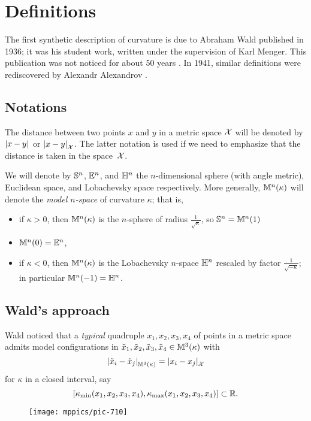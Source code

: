 \chapter{Definitions}

The first synthetic description of curvature is due to Abraham Wald \cite{wald} published in 1936;
it was his student work, written under the supervision of Karl Menger. 
This publication was not noticed for about 50 years \cite{berestovskii}.
In 1941, similar definitions were rediscovered by Alexandr Alexandrov \cite{alexandrov:def}.

\section{Notations}

The distance between two points $x$ and $y$ in a metric space $\mathcal{X}$ will be denoted by $\dist{x}{y}{}$ or $\dist{x}{y}{\spc{X}}$.
The latter notation is used if we need to emphasize 
that the distance is taken in the space~${\mathcal{X}}$.

We will denote by $\mathbb{S}^n$, $\mathbb{E}^n$, and $\mathbb{H}^n$ the $n$-dimensional sphere (with angle metric), 
Euclidean space, and Lobachevsky space respectively.
More generally, $\mathbb{M}^n(\kappa)$ will denote the \emph{model $n$-space} of curvature $\kappa$;
that is,
\begin{itemize}
\item if $\kappa>0$, then $\mathbb{M}^n(\kappa)$ is the $n$-sphere of radius $\tfrac{1}{\sqrt{\kappa}}$, so $\mathbb{S}^n=\mathbb{M}^n(1)$
\item $\mathbb{M}^n(0)=\mathbb{E}^n$,
\item if $\kappa<0$, then $\mathbb{M}^n(\kappa)$ is the Lobachevsky $n$-space $\mathbb{H}^n$ rescaled by factor $\tfrac{1}{\sqrt{-\kappa}}$;
in particular $\mathbb{M}^n(-1)=\mathbb{H}^n$.
\end{itemize}

\section{Wald's approach}

Wald noticed that a \textit{typical} quadruple $x_1,x_2,x_3,x_4$ of points in a metric space
admits model configurations in $\tilde x_1,\tilde x_2,\tilde x_3,\tilde x_4\in\mathbb{M}^3(\kappa)$ with
\[\dist{\tilde x_i}{\tilde x_j}{\MM^3(\kappa)}=\dist{x_i}{x_j}{\spc{X}}\]
for $\kappa$ in a closed interval,
say 
\[[\kappa_{\min}(x_1,x_2,x_3,x_4),\kappa_{\max}(x_1,x_2,x_3,x_4)]\subset \mathbb{R}.\]

\begin{wrapfigure}{r}{33mm}
\vskip-2mm
\centering
\texttt{[image: mppics/pic-710]}
\end{wrapfigure}

